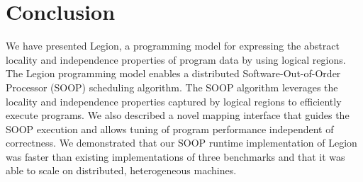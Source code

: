 \section{Conclusion}
\label{sec:conc}

We have presented Legion, a programming model for expressing
the abstract locality and independence properties of program
data by using logical regions.  The Legion programming model enables 
a distributed Software-Out-of-Order Processor (SOOP) scheduling 
algorithm.  The SOOP algorithm leverages the locality and independence properties
captured by logical regions to efficiently execute programs.  We also
described a novel mapping interface that guides the SOOP execution
and allows tuning of program performance independent of correctness.
We demonstrated that our SOOP runtime implementation
of Legion was faster than existing implementations of
three benchmarks and that it was able to scale on distributed, heterogeneous
machines.


